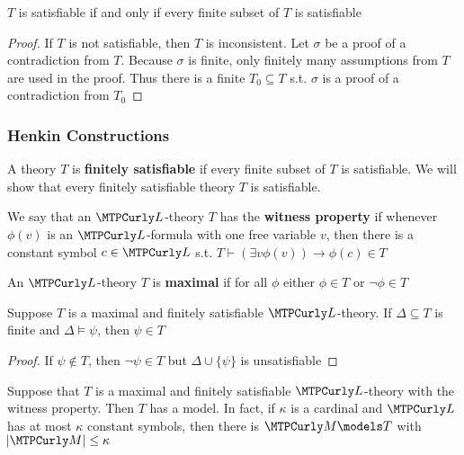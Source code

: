 \documentclass[11pt]{article}
\begin{document}
\begin{theorem}
\(T\) is satisfiable if and only if every finite subset of \(T\) is satisfiable
\end{theorem}

\begin{proof}
If \(T\) is not satisfiable, then \(T\) is inconsistent. Let \(\sigma\) be a proof of
a contradiction from  \(T\). Because \(\sigma\) is finite, only finitely many
assumptions from \(T\) are used in the proof. Thus there is a finite
\(T_0\subseteq T\) s.t. \(\sigma\) is a proof of a contradiction from \(T_0\)
\end{proof}

\subsubsection{Henkin Constructions}
\label{sec:orgf332703}
A theory \(T\) is \textbf{finitely satisfiable} if every finite subset of \(T\) is
satisfiable. We will show that every finitely satisfiable theory \(T\) is
satisfiable.

\begin{definition}[]
We say that an \(\call\)-theory \(T\) has the \textbf{witness property} if whenever
\(\phi(v)\) is an \(\call\)-formula with one free variable \(v\), then there is
a constant symbol \(c\in\call\) s.t. \(T\vdash(\exists v\phi(v))\to\phi(c)\in T\)

An \(\call\)-theory \(T\) is \textbf{maximal} if for all \(\phi\) either \(\phi\in T\) or
\(\neg\phi\in T\)
\end{definition}

\begin{lemma}[]
\label{lemma2.1.6}
Suppose \(T\) is a maximal and finitely satisfiable \(\call\)-theory. If
\(\Delta\subseteq T\) is finite and \(\Delta\models\psi\), then \(\psi\in T\)
\end{lemma}

\begin{proof}
If \(\psi\not\in T\), then \(\neg\psi\in T\) but \(\Delta\cup\{\psi\}\) is
unsatisfiable 
\end{proof}

\begin{lemma}[]
\label{lemma2.1.7}
Suppose that \(T\) is a maximal and finitely satisfiable \(\call\)-theory with
the witness property. Then \(T\) has a model. In fact, if \(\kappa\) is a cardinal
and \(\call\) has at most \(\kappa\) constant symbols, then there is
\(\calm\models T\) with \(\abs{\calm}\le\kappa\)
\end{lemma}
\end{document}
